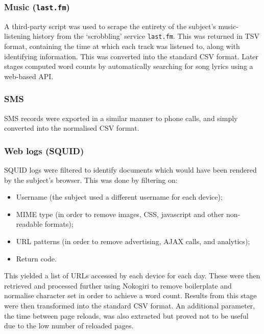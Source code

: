 \subsubsection*{Music (\texttt{last.fm})}
A third-party script was used to scrape the entirety of the subject's music-listening history from the `scrobbling' service \texttt{last.fm}.  This was returned in TSV format, containing the time at which each track was listened to, along with identifying information.  This was converted into the standard CSV format.  Later stages computed word counts by automatically searching for song lyrics using a web-based API.%



\subsubsection*{SMS}
SMS records were exported in a similar manner to phone calls, and simply converted into the normalised CSV format.



\subsubsection*{Web logs (SQUID)}
SQUID logs were filtered to identify documents which would have been rendered by the subject's browser.  This was done by filtering on:

\begin{itemize}
    \item Username (the subject used a different username for each device);
    \item MIME type (in order to remove images, CSS, javascript and other non-readable formats);
    \item URL patterns (in order to remove advertising, AJAX calls, and analytics);
    \item Return code.
\end{itemize}

This yielded a list of URLs accessed by each device for each day.  These were then retrieved and processed further using Nokogiri to remove boilerplate and normalise character set in order to achieve a word count.  Results from this stage were then transformed into the standard CSV format.  An additional parameter, the time between page reloads, was also extracted but proved not to be useful due to the low number of reloaded pages.

